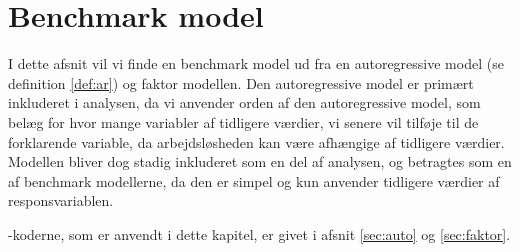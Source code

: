 \chapter{Benchmark model} \label{ch:benhcmarkmodel}
I dette afsnit vil vi finde en benchmark model ud fra en autoregressive model (se definition \ref{def:ar}) og faktor modellen. 
Den autoregressive model er primært inkluderet i analysen, da vi anvender orden af den autoregressive model, som belæg for hvor mange variabler af tidligere værdier, vi senere vil tilføje til de forklarende variable, da arbejdsløsheden kan være afhængige af tidligere værdier. 
Modellen bliver dog stadig inkluderet som en del af analysen, og betragtes som en af benchmark modellerne, da den er simpel og kun anvender tidligere værdier af responsvariablen.

\Rlang-koderne, som er anvendt i dette kapitel, er givet i afsnit \ref{sec:auto} og \ref{sec:faktor}.





